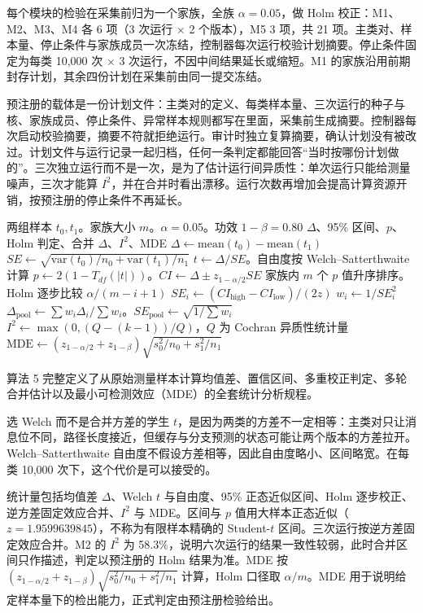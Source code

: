 每个模块的检验在采集前归为一个家族，全族 $\alpha=0.05$，做 Holm 校正：M1、M2、M3、M4 各 6 项（3 次运行 × 2 个版本），M5 3 项，共 21 项。主类对、样本量、停止条件与家族成员一次冻结，控制器每次运行校验计划摘要。停止条件固定为每类 10,000 次 × 3 次运行，不因中间结果延长或缩短。M1 的家族沿用前期封存计划，其余四份计划在采集前由同一提交冻结。

预注册的载体是一份计划文件：主类对的定义、每类样本量、三次运行的种子与核、家族成员、停止条件、异常样本规则都写在里面，采集前生成摘要。控制器每次启动校验摘要，摘要不符就拒绝运行。审计时独立复算摘要，确认计划没有被改过。计划文件与运行记录一起归档，任何一条判定都能回答“当时按哪份计划做的”。三次独立运行而不是一次，是为了估计运行间异质性：单次运行只能给测量噪声，三次才能算 $I^2$，并在合并时看出漂移。运行次数再增加会提高计算资源开销，按预注册的停止条件不再延长。

\begin{algorithm}[H]
\caption{统计判定与合并}
\label{alg:stats}
\begin{algorithmic}[1]
\Require 两组样本 $t_0,t_1$。家族大小 $m$。$\alpha=0.05$。功效 $1-\beta=0.80$
\Ensure $\Delta$、95\% 区间、$p$、Holm 判定、合并 $\Delta$、$I^2$、MDE
\State $\Delta \gets \mathrm{mean}(t_0)-\mathrm{mean}(t_1)$
\State $SE \gets \sqrt{\mathrm{var}(t_0)/n_0+\mathrm{var}(t_1)/n_1}$
\State $t \gets \Delta/SE$。自由度按 Welch--Satterthwaite 计算
\State $p \gets 2(1-T_{df}(|t|))$。$CI \gets \Delta \pm z_{1-\alpha/2}SE$
\State 家族内 $m$ 个 $p$ 值升序排序。Holm 逐步比较 $\alpha/(m-i+1)$
  \State $SE_i \gets (CI_{\mathrm{high}}-CI_{\mathrm{low}})/(2z)$
  \State $w_i \gets 1/SE_i^2$
\EndFor
\State $\Delta_{\mathrm{pool}} \gets \sum w_i\Delta_i/\sum w_i$。$SE_{\mathrm{pool}} \gets \sqrt{1/\sum w_i}$
\State $I^2 \gets \max(0,(Q-(k-1))/Q)$，$Q$ 为 Cochran 异质性统计量
\State $\mathrm{MDE} \gets (z_{1-\alpha/2}+z_{1-\beta})\sqrt{s_0^2/n_0+s_1^2/n_1}$
\end{algorithmic}
\end{algorithm}

算法 5 完整定义了从原始测量样本计算均值差、置信区间、多重校正判定、多轮合并估计以及最小可检测效应（MDE）的全套统计分析规程。

选 Welch 而不是合并方差的学生 $t$，是因为两类的方差不一定相等：主类对只让消息位不同，路径长度接近，但缓存与分支预测的状态可能让两个版本的方差拉开。Welch--Satterthwaite 自由度不假设方差相等，因此自由度略小、区间略宽。在每类 10,000 次下，这个代价是可以接受的。

统计量包括均值差 $\Delta$、Welch $t$ 与自由度、95\% 正态近似区间、Holm 逐步校正、逆方差固定效应合并、$I^2$ 与 MDE。区间与 $p$ 值用大样本正态近似（$z=1.9599639845$），不称为有限样本精确的 Student-$t$ 区间。三次运行按逆方差固定效应合并。M2 的 $I^2$ 为 58.3\%，说明六次运行的结果一致性较弱，此时合并区间只作描述，判定以预注册的 Holm 结果为准。MDE 按 $(z_{1-\alpha/2}+z_{1-\beta})\sqrt{s_0^2/n_0+s_1^2/n_1}$ 计算，Holm 口径取 $\alpha/m$。MDE 用于说明给定样本量下的检出能力，正式判定由预注册检验给出。 %

